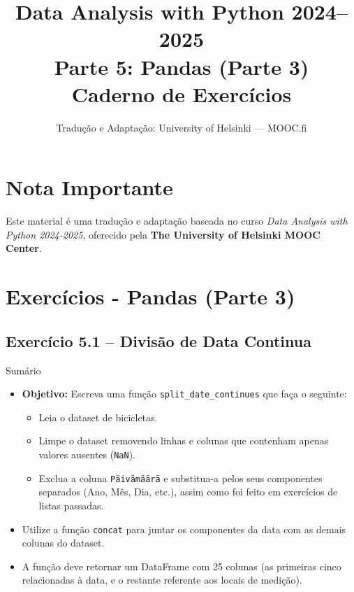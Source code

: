 \documentclass[11pt,a4paper]{article}
\title{\textbf{Data Analysis with Python 2024--2025}\\Parte 5: Pandas (Parte 3)\\\large Caderno de Exercícios}
\author{Tradução e Adaptação: University of Helsinki --- MOOC.fi}
\date{}
\begin{document}
\maketitle

\section*{Nota Importante}
Este material é uma tradução e adaptação baseada no curso \textit{Data Analysis with Python 2024-2025}, oferecido pela \textbf{The University of Helsinki MOOC Center}.

\tableofcontents
\newpage

\section{Exercícios - Pandas (Parte 3)}

\subsection*{Exercício 5.1 -- Divisão de Data Continua}
\begin{exercicio}{Sumário}
\begin{itemize}
    \item \textbf{Objetivo:} Escreva uma função \texttt{split\_date\_continues} que faça o seguinte:
    \begin{itemize}
        \item Leia o dataset de bicicletas.
        \item Limpe o dataset removendo linhas e colunas que contenham apenas valores ausentes (\texttt{NaN}).
        \item Exclua a coluna \texttt{Päivämäärä} e substitua-a pelos seus componentes separados (Ano, Mês, Dia, etc.), assim como foi feito em exercícios de listas passadas.
    \end{itemize}
    \item Utilize a função \texttt{concat} para juntar os componentes da data com as demais colunas do dataset.
    \item A função deve retornar um DataFrame com 25 colunas (as primeiras cinco relacionadas à data, e o restante referente aos locais de medição).
\end{itemize}
\end{exercicio}
\end{document}
